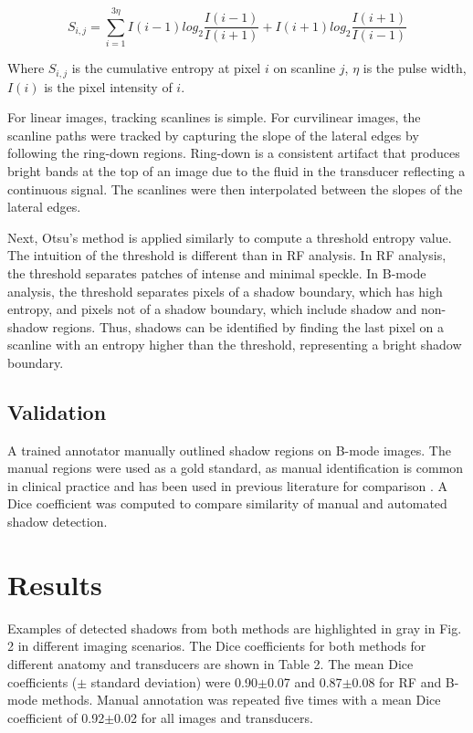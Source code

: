 \documentclass[preprint,5p,authoryear]{elsarticle}
\begin{document}
\begin{equation}
S_{i,j} = \sum_{i=1}^{3\eta}I(i-1)log_{2}\frac{I(i-1)}{I(i+1)}+I(i+1)log_{2}\frac{I(i+1)}{I(i-1)}
\end{equation}

Where $S_{i,j}$ is the cumulative entropy at pixel $i$ on scanline $j$, $\eta$ is the pulse width, $I(i)$ is the pixel intensity of $i$.

For linear images, tracking scanlines is simple. For curvilinear images, the scanline paths were tracked by capturing the slope of the lateral edges by following the ring-down regions. Ring-down is a consistent artifact that produces bright bands at the top of an image due to the fluid in the transducer reflecting a continuous signal. The scanlines were then interpolated between the slopes of the lateral edges.

Next, Otsu's method is applied similarly to compute a threshold entropy value. The intuition of the threshold is different than in RF analysis. In RF analysis, the threshold separates patches of intense and minimal speckle. In B-mode analysis, the threshold separates pixels of a shadow boundary, which has high entropy, and pixels not of a shadow boundary, which include shadow and non-shadow regions. Thus, shadows can be identified by finding the last pixel on a scanline with an entropy higher than the threshold, representing a bright shadow boundary.


\subsection*{Validation}

A trained annotator manually outlined shadow regions on B-mode images. The manual regions were used as a gold standard, as manual identification is common in clinical practice and has been used in previous literature for comparison \citep{Hellier2010}. A Dice coefficient was computed to compare similarity of manual and automated shadow detection.
%
\section*{Results}
\label{Results}
Examples of detected shadows from both methods are highlighted in gray in Fig. 2 in different imaging scenarios. The Dice coefficients for both methods for different anatomy and transducers are shown in Table 2. The mean Dice coefficients ($\pm$ standard deviation) were 0.90$\pm$0.07 and 0.87$\pm$0.08 for RF and B-mode methods. Manual annotation was repeated five times with a mean Dice coefficient of 0.92$\pm$0.02 for all images and transducers.
\end{document}
